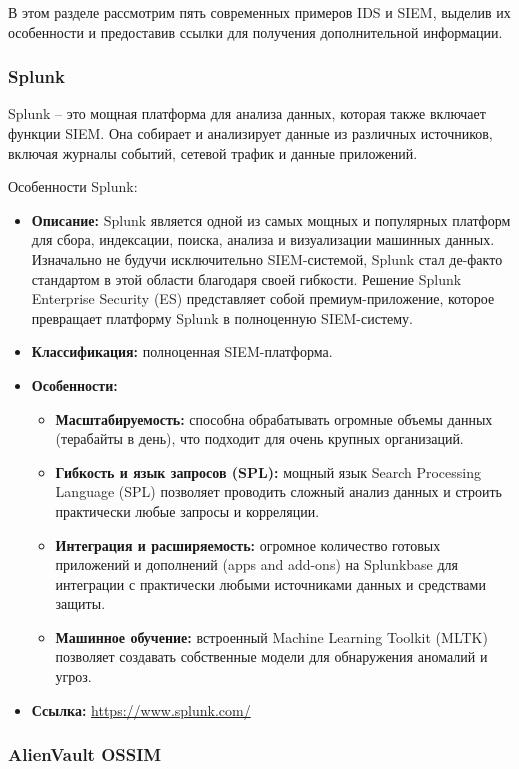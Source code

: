 В этом разделе рассмотрим пять современных примеров IDS и SIEM, выделив их особенности и предоставив ссылки для получения дополнительной информации.

\subsubsection{Splunk}

Splunk -- это мощная платформа для анализа данных, которая также включает функции SIEM. Она собирает и анализирует данные из различных источников, включая журналы событий, сетевой трафик и данные приложений.

Особенности Splunk:
\begin{itemize}
		\item \textbf{Описание:} Splunk является одной из самых мощных и популярных платформ для сбора, индексации, поиска, анализа и визуализации машинных данных. Изначально не будучи исключительно SIEM-системой, Splunk стал де-факто стандартом в этой области благодаря своей гибкости. Решение Splunk Enterprise Security (ES) представляет собой премиум-приложение, которое превращает платформу Splunk в полноценную SIEM-систему.
    \item \textbf{Классификация:} полноценная SIEM-платформа.
    \item \textbf{Особенности:}
    \begin{itemize}
        \item \textbf{Масштабируемость:} способна обрабатывать огромные объемы данных (терабайты в день), что подходит для очень крупных организаций.
        \item \textbf{Гибкость и язык запросов (SPL):} мощный язык Search Processing Language (SPL) позволяет проводить сложный анализ данных и строить практически любые запросы и корреляции.
        \item \textbf{Интеграция и расширяемость:} огромное количество готовых приложений и дополнений (apps and add-ons) на Splunkbase для интеграции с практически любыми источниками данных и средствами защиты.
        \item \textbf{Машинное обучение:} встроенный Machine Learning Toolkit (MLTK) позволяет создавать собственные модели для обнаружения аномалий и угроз.
    \end{itemize}
    \item \textbf{Ссылка:} \url{https://www.splunk.com/}
\end{itemize}

\subsubsection{AlienVault OSSIM}

